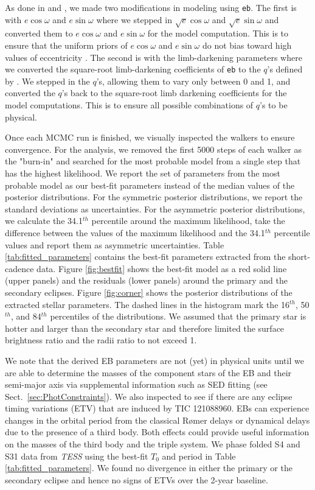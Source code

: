 \documentclass[fleqn,usenatbib]{mnras} %
\begin{document}
As done in \citet[][]{Han2017} and \citet[][]{Han2019}, we made two modifications in modeling using \texttt{eb}. The first is with $e\cos{\omega}$ and $e\sin{\omega}$ where we stepped in $\sqrt{e} \cos{\omega}$ and $\sqrt{e} \sin{\omega}$ and converted them to  $e\cos{\omega}$ and $e\sin{\omega}$ for the model computation. This is to ensure that the uniform priors of $e\cos{\omega}$ and $e\sin{\omega}$ do not bias toward high values of eccentricity \citep[][]{Ford2006}. The second is with the limb-darkening parameters where we converted the square-root limb-darkening coefficients of \texttt{eb} to the $q$'s defined by \citet{Kipping2013}. We stepped in the $q$'s, allowing them to vary only between 0 and 1, and converted the $q$'s back to the square-root limb darkening coefficients for the model computations. This is to ensure all possible combinations of $q$'s to be physical.

Once each MCMC run is finished, we visually inspected the walkers to ensure convergence. For the analysis, we removed the first 5000 steps of each walker as the "burn-in" and searched for the most probable model from a single step that has the highest likelihood. We report the set of parameters from the most probable model as our best-fit parameters instead of the median values of the posterior distributions. For the symmetric posterior distributions, we report the standard deviations as uncertainties. For the asymmetric posterior distributions, we calculate the 34.1$^{th}$ percentile around the maximum likelihood, take the difference between the values of the maximum likelihood and the 34.1$^{th}$ percentile values and report them as asymmetric uncertainties. Table \ref{tab:fitted_parameters} contains the best-fit parameters extracted from the short-cadence data. Figure \ref{fig:bestfit} shows the best-fit model as a red solid line (upper panels) and the residuals (lower panels) around the primary and the secondary eclipses. Figure \ref{fig:corner} shows the posterior distributions of the extracted stellar parameters. The dashed lines in the histogram mark the 16$^{th}$, 50$^{th}$, and 84$^{th}$ percentiles of the distributions. We assumed that the primary star is hotter and larger than the secondary star and therefore limited the surface brightness ratio and the radii ratio to not exceed 1.

We note that the derived EB parameters are not (yet) in physical units until we are able to determine the masses of the component stars of the EB and their semi-major axis via supplemental information such as SED fitting (see Sect.~\ref{sec:PhotConstraints}). We also inspected to see if there are any eclipse timing variations (ETV) that are induced by TIC 121088960. EBs can experience changes in the orbital period from the classical R\o{}mer delays or dynamical delays due to the presence of a third body. Both effects could provide useful information on the masses of the third body and the triple system. We phase folded S4 and S31 data from {\em TESS} using the best-fit $T_0$ and period in Table \ref{tab:fitted_parameters}. We found no divergence in either the primary or the secondary eclipse and hence no signs of ETVs over the 2-year baseline.
\end{document}
